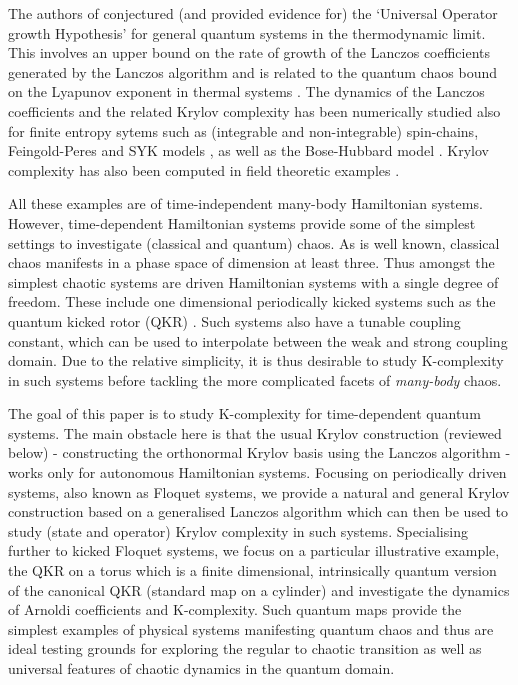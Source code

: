 \documentclass[a4paper,12pt]{article}
\begin{document}
The authors of \cite{Parker_2019} conjectured (and provided evidence for) the `Universal Operator growth Hypothesis' for general quantum systems in the thermodynamic limit.  This involves an upper bound on the rate of growth of the Lanczos coefficients  generated by the Lanczos algorithm and is related to the quantum chaos bound on the Lyapunov exponent in thermal systems \cite{Maldacena:2015waa}. The dynamics of the Lanczos coefficients and the related Krylov complexity has been numerically studied also for finite entropy sytems such as (integrable and non-integrable) spin-chains, Feingold-Peres and SYK models \cite{Parker_2019, integrability_to_chaos, Rabinovici_2021, Rabinovici_2022},  as well as the Bose-Hubbard model \cite{Bhattacharyya:2023dhp}. Krylov complexity has also been computed in field theoretic examples \cite{Dymarsky:2021bjq, Avdoshkin:2022xuw, Caputa:2021ori, Kundu:2023hbk}.

All these examples are of time-independent many-body Hamiltonian systems. However, time-dependent Hamiltonian systems provide some of the simplest settings to investigate (classical and quantum) chaos. As is well known, classical chaos manifests in a phase space of dimension at least three. Thus amongst the simplest chaotic systems are driven Hamiltonian systems with a single degree of freedom. These include one dimensional periodically kicked systems such as the quantum kicked rotor (QKR) \cite{Izrailev}. Such systems also have a tunable coupling constant, which can be used to interpolate between the weak and strong coupling domain. Due to the relative simplicity, it is thus desirable to study K-complexity in such systems before tackling the more complicated facets of {\it many-body} chaos.

The goal of this paper is to study K-complexity for time-dependent quantum systems. The main obstacle here is that the usual Krylov construction (reviewed below) - constructing the orthonormal Krylov basis using the Lanczos algorithm - works only for autonomous Hamiltonian systems. Focusing on periodically driven systems, also known as Floquet systems, we provide a natural and general Krylov construction based on a generalised Lanczos algorithm which can then be used to study (state and operator) Krylov complexity in such systems. Specialising further to kicked Floquet systems, we focus on a particular illustrative example, the QKR on a torus which is a finite dimensional, intrinsically quantum version of the canonical QKR (standard map on a cylinder) and investigate the dynamics of Arnoldi coefficients and K-complexity. Such quantum maps provide the simplest examples of physical systems manifesting quantum chaos and thus are ideal testing grounds for exploring the regular to chaotic transition as well as universal features of chaotic dynamics in the quantum domain.
\end{document}
